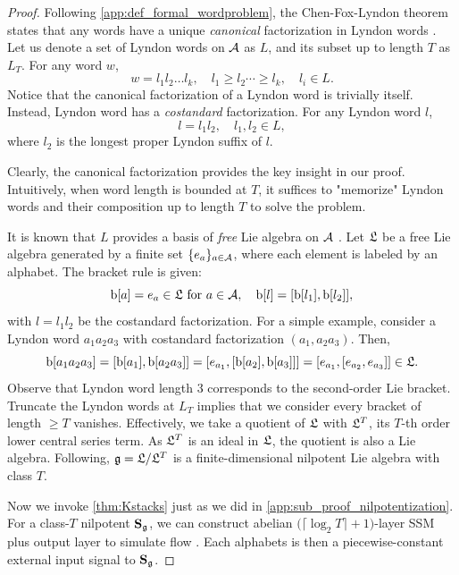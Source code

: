 \begin{proof}
Following \cref{app:def_formal_wordproblem}, 
the Chen-Fox-Lyndon theorem states that any words have a unique \emph{canonical} factorization in Lyndon words \cite{chen1958free,melanccon1989lyndon,avdieiev2024affine}.
Let us denote a set of Lyndon words on $\mathcal{A}$ as $L$, and its subset up to length $T$ as $L_T$.
For any word $w$,
\begin{equation*}
    w = l_1l_2\ldots l_k,
    \quad
    l_1 \ge l_2 \cdots \ge l_k,
    \quad
    l_i \in L.
\end{equation*}
Notice that the canonical factorization of a Lyndon word is trivially itself.
Instead, Lyndon word has a \emph{costandard} factorization. For any Lyndon word $l$,
\begin{equation*}
    l = l_1l_2,
    \quad
    l_1, l_2 \in L,
\end{equation*}
where $l_2$ is the longest proper Lyndon suffix of $l$.

Clearly, the canonical factorization provides the key insight in our proof.
Intuitively, when word length is bounded at $T$,
it suffices to "memorize" Lyndon words and their composition up to length $T$ to solve the problem.

It is known that $L$ provides a basis of \emph{free} Lie algebra on $\mathcal{A}$ \cite{avdieiev2024affine, walker2024log}.
Let $\mathfrak{L}$ be a free Lie algebra generated by a finite set $\{e_a\}_{a \in \mathcal{A}}$,
where each element is labeled by an alphabet.
The bracket rule is given:
\begin{equation}
    \text{b}[a] = e_a \in \mathfrak{L} \text{ for } a \in \mathcal{A},
    \quad
    \text{b}[l] = [\text{b}[l_1],\text{b}[l_2]],
\end{equation}
with $l=l_1l_2$ be the costandard factorization.
For a simple example, consider a Lyndon word $a_1a_2a_3$ with costandard factorization $(a_1, a_2a_3)$. Then, 
\begin{equation*}
    \text{b}[a_1a_2a_3] = [\text{b}[a_1], \text{b}[a_2a_3]] = [e_{a_1}, [\text{b}[a_2], \text{b}[a_3]]] = [e_{a_1}, [e_{a_2}, e_{a_3}]] \in \mathfrak{L}.
\end{equation*}
Observe that Lyndon word length $3$ corresponds to the second-order Lie bracket.
Truncate the Lyndon words at $L_T$ implies that we consider every bracket of length $\ge T$ vanishes.
Effectively, we take a quotient of $\mathfrak{L}$ with $\mathfrak{L}^T$, its $T$-th order lower central series term.
As $\mathfrak{L}^T$ is an ideal in $\mathfrak{L}$, the quotient is also a Lie algebra.
Following, $\mathfrak{g} = \mathfrak{L} / \mathfrak{L}^T$ is a finite-dimensional nilpotent Lie algebra with class $T$.

Now we invoke \cref{thm:Kstacks} just as we did in \cref{app:sub_proof_nilpotentization}.
For a class-$T$ nilpotent $\mathbf{S}_{\mathfrak{g}}$, we can construct abelian $\bigl(\lceil \log_2T \rceil + 1\bigr)$-layer SSM plus output layer to simulate flow \cite{burde2012derived}.
Each alphabets is then a piecewise-constant external input signal to $\mathbf{S}_{\mathfrak{g}}$.
\end{proof}
